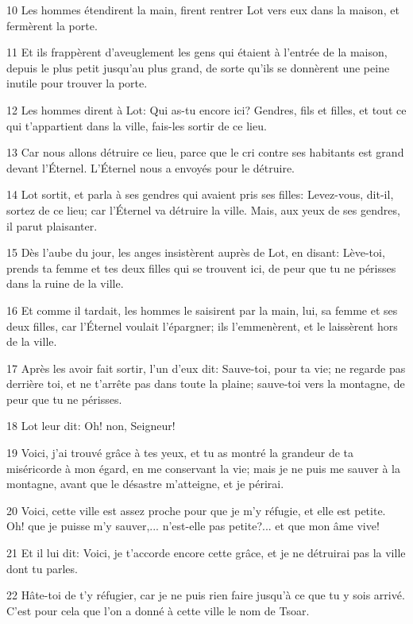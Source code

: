\par 10 Les hommes étendirent la main, firent rentrer Lot vers eux dans la maison, et fermèrent la porte.
\par 11 Et ils frappèrent d'aveuglement les gens qui étaient à l'entrée de la maison, depuis le plus petit jusqu'au plus grand, de sorte qu'ils se donnèrent une peine inutile pour trouver la porte.
\par 12 Les hommes dirent à Lot: Qui as-tu encore ici? Gendres, fils et filles, et tout ce qui t'appartient dans la ville, fais-les sortir de ce lieu.
\par 13 Car nous allons détruire ce lieu, parce que le cri contre ses habitants est grand devant l'Éternel. L'Éternel nous a envoyés pour le détruire.
\par 14 Lot sortit, et parla à ses gendres qui avaient pris ses filles: Levez-vous, dit-il, sortez de ce lieu; car l'Éternel va détruire la ville. Mais, aux yeux de ses gendres, il parut plaisanter.
\par 15 Dès l'aube du jour, les anges insistèrent auprès de Lot, en disant: Lève-toi, prends ta femme et tes deux filles qui se trouvent ici, de peur que tu ne périsses dans la ruine de la ville.
\par 16 Et comme il tardait, les hommes le saisirent par la main, lui, sa femme et ses deux filles, car l'Éternel voulait l'épargner; ils l'emmenèrent, et le laissèrent hors de la ville.
\par 17 Après les avoir fait sortir, l'un d'eux dit: Sauve-toi, pour ta vie; ne regarde pas derrière toi, et ne t'arrête pas dans toute la plaine; sauve-toi vers la montagne, de peur que tu ne périsses.
\par 18 Lot leur dit: Oh! non, Seigneur!
\par 19 Voici, j'ai trouvé grâce à tes yeux, et tu as montré la grandeur de ta miséricorde à mon égard, en me conservant la vie; mais je ne puis me sauver à la montagne, avant que le désastre m'atteigne, et je périrai.
\par 20 Voici, cette ville est assez proche pour que je m'y réfugie, et elle est petite. Oh! que je puisse m'y sauver,... n'est-elle pas petite?... et que mon âme vive!
\par 21 Et il lui dit: Voici, je t'accorde encore cette grâce, et je ne détruirai pas la ville dont tu parles.
\par 22 Hâte-toi de t'y réfugier, car je ne puis rien faire jusqu'à ce que tu y sois arrivé. C'est pour cela que l'on a donné à cette ville le nom de Tsoar.
